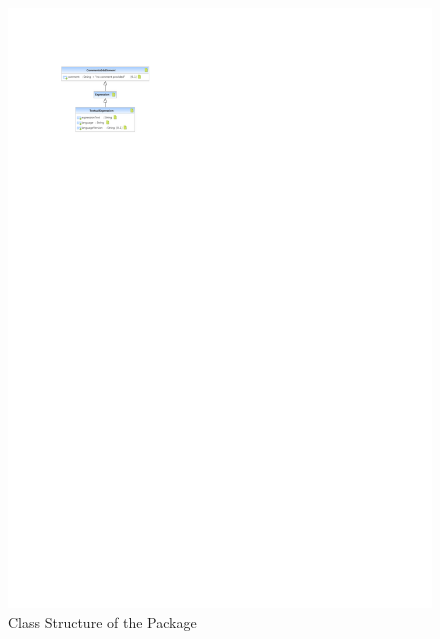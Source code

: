 %
%

\begin{figure}[htb]
  \centering
  \includegraphics[scale=2]{figures/A_technical-reference/packages/core_expressions/core-expressions}
  \caption{Class Structure of the  Package}
  \label{fig:MM:expressions}
\end{figure}
